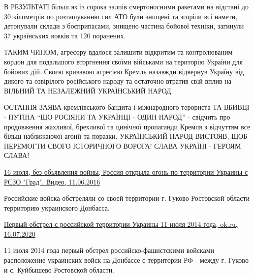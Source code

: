 В РЕЗУЛЬТАТІ  більш як із сорока залпів смертоносними ракетами на відстані
до 30 кілометрів по розташуванню сил АТО були знищені та згоріли всі
намети, детонували склади з боєприпасами, знищено  частина  бойової
техніки,  загинули  37  українських вояків  та  120  поранених.  

ТАКИМ  ЧИНОМ,  агресору вдалося залишити відкритим та контролюваним кордон
для подальшого вторгнення своїми військами на територію України для бойових
дій. Своєю кривавою агресією Кремль назавжди відвернув Україну від дикого
та озвірілого російського народу та остаточно втратив свій вплив на ВІЛЬНИЙ
ТА  НЕЗАЛЕЖНИЙ  УКРАЇНСЬКИЙ  НАРОД. 

ОСТАННЯ ЗАЯВА кремлівського бандита і міжнародного терориста ТА ВБИВЦІ
- ПУТІНА \enquote{ЩО РОСІЯНИ ТА УКРАЇНЦІ - ОДИН НАРОД} - свідчить про
продовження жахливої, брехливої та цинічної пропаганди Кремля з
відчуттям все більш наближаючої агонії та поразки. УКРАЇНСЬКИЙ НАРОД
ВИСТОЯВ, ЩОБ ПЕРЕМОГТИ СВОГО ІСТОРИЧНОГО ВОРОГА! СЛАВА УКРАЇНІ -
ГЕРОЯМ СЛАВА!

\href{https://ok.ru/video/1178866029?fromTime=5}{%
16 июля, без обьявления войны, Россия открыла огонь по территории Украины с РСЗО "Град". Видео, %
11.06.2016%
}

Российские войска обстреляли со своей территории г. Гуково Ростовской
области территорию украинского Донбасса. 

\href{https://ok.ru/video/2245143562795?fromTime=79}{%
Первый обстрел с российской территории Украины 11 июля 2014 года, ok.ru, %
16.07.2020%
}

11 июля 2014 года первый обстрел российско-фашистскими войсками
расположение украинских войск на Донбассе с территории РФ - между
г. Гуково и с. Куйбышево Ростовской области.
